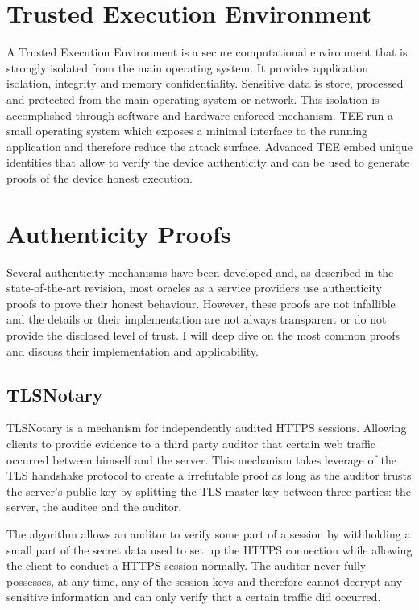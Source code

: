 \section{Trusted Execution Environment}
A Trusted Execution Environment is a secure computational environment that is strongly isolated from the main operating system. It provides application isolation, integrity and memory confidentiality. Sensitive data is store, processed and protected from the main operating system or network. This isolation is accomplished through software and hardware enforced mechanism. TEE run a small operating system which exposes a minimal interface to the running application and therefore reduce the attack surface. Advanced TEE embed unique identities that allow to verify the device authenticity and can be used to generate proofs of the device honest execution.

\section{Authenticity Proofs}

Several authenticity mechanisms have been developed and, as described in the state-of-the-art revision, most oracles as a service providers use authenticity proofs to prove their honest behaviour. However, these proofs are not infallible and the details or their implementation are not always transparent or do not provide the disclosed level of trust. I will deep dive on the most common proofs and discuss their implementation and applicability.
 
\subsection{TLSNotary}

TLSNotary is a mechanism for independently audited HTTPS sessions. Allowing clients to provide evidence to a third party auditor that certain web traffic occurred between himself and the server. This mechanism takes leverage of the TLS handshake protocol to create a irrefutable proof as long as the auditor trusts the server's public key by splitting the TLS master key between three parties: the server, the auditee and the auditor.

The algorithm allows an auditor to verify some part of a session by withholding a small part of the secret data used to set up the HTTPS connection while allowing the client to conduct a HTTPS session normally. The auditor never fully possesses, at any time, any of the session keys and therefore cannot decrypt any sensitive information and can only verify that a certain traffic did occurred.

